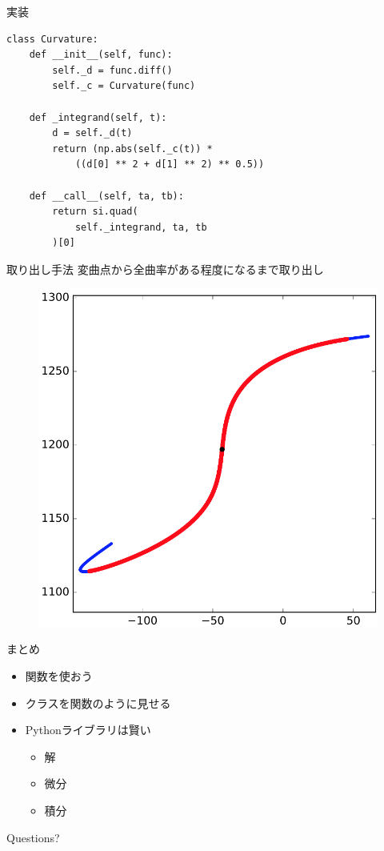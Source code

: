 \documentclass[12pt, xetex, xcolor=pdftex, dvipsnames]{beamer}
\begin{document}
\begin{frame}[fragile]{実装}
\begin{lstlisting}
class Curvature:
    def __init__(self, func):
        self._d = func.diff()
        self._c = Curvature(func)

    def _integrand(self, t):
        d = self._d(t)
        return (np.abs(self._c(t)) *
            ((d[0] ** 2 + d[1] ** 2) ** 0.5))

    def __call__(self, ta, tb):
        return si.quad(
            self._integrand, ta, tb
        )[0]
\end{lstlisting}
\end{frame}
\begin{frame}{取り出し手法}
    変曲点から全曲率がある程度になるまで取り出し
    \begin{figure}
        \centering
        \includegraphics[height=0.7\textheight]{img/trim.png}
    \end{figure}
\end{frame}
\begin{frame}{まとめ}
    \begin{itemize}
        \item 関数を使おう
        \item クラスを関数のように見せる
        \item Pythonライブラリは賢い
        \begin{itemize}
            \item 解
            \item 微分
            \item 積分
        \end{itemize}
    \end{itemize}
\end{frame}
\begin{frame}[standout]
  Questions?
\end{frame}
\end{document}
